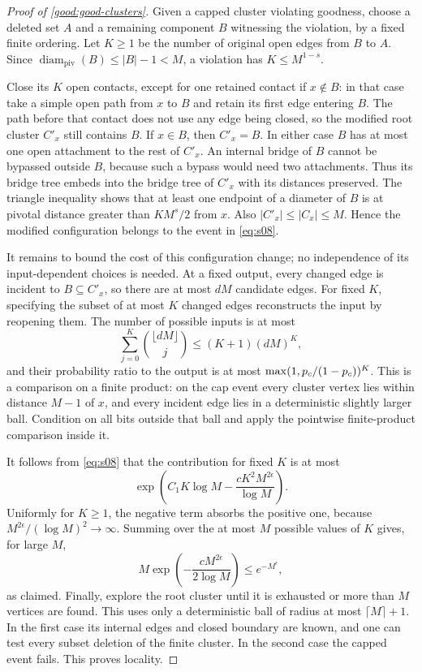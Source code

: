 \begin{proof}[Proof of \cref{good:good-clusters}]
Given a capped cluster violating goodness, choose a deleted set $A$
and a remaining component $B$ witnessing the violation, by a fixed
finite ordering. Let $K\ge1$ be the number of original open edges
from $B$ to $A$. Since
$\operatorname{diam}_{\mathrm{piv}}(B)\le|B|-1<M$, a violation has
$K\le M^{1-s}$.

Close its $K$ open contacts, except for one retained contact if
$x\notin B$: in that case take a simple open path from $x$ to $B$
and retain its first edge entering $B$. The path before that contact
does not use any edge being closed, so the modified root cluster
$C'_x$ still contains $B$. If $x\in B$, then $C'_x=B$. In either
case $B$ has at most one open attachment to the rest of $C'_x$.
An internal bridge of $B$ cannot be bypassed outside $B$, because
such a bypass would need two attachments. Thus its bridge tree
embeds into the bridge tree of $C'_x$ with its distances preserved.
The triangle inequality shows that at least one endpoint of a
diameter of $B$ is at pivotal distance greater than $KM^s/2$ from
$x$. Also $|C'_x|\le|C_x|\le M$. Hence the modified configuration
belongs to the event in \eqref{eq:s08}.

It remains to bound the cost of this configuration change; no
independence of its input-dependent choices is needed. At a fixed
output, every changed edge is incident to $B\subseteq C'_x$, so
there are at most $dM$ candidate edges. For fixed $K$, specifying
the subset of at most $K$ changed edges reconstructs the input by
reopening them. The number of possible inputs is at most
\[
 \sum_{j=0}^K\binom{\lfloor dM\rfloor}{j}\le(K+1)(dM)^K,
\]
and their probability ratio to the output is at most
$\max(1,{p_c}/(1-{p_c}))^K$. This is a comparison on a finite product:
on the cap event every cluster vertex lies within distance $M-1$
of $x$, and every incident edge lies in a deterministic slightly
larger ball. Condition on all bits outside that ball and apply the
pointwise finite-product comparison inside it.

It follows from \eqref{eq:s08} that the contribution for fixed $K$
is at most
\[
 \exp\left(C_1K\log M-
                 \frac{cK^2M^{2\epsilon}}{\log M}\right).
\]
Uniformly for $K\ge1$, the negative term absorbs the positive one,
because $M^{2\epsilon}/(\log M)^2\to\infty$. Summing over the at
most $M$ possible values of $K$ gives, for large $M$,
\[
 M\exp\left(-\frac{cM^{2\epsilon}}{2\log M}\right)
 \le e^{-M^\epsilon},
\]
as claimed. Finally, explore the root cluster until it is exhausted
or more than $M$ vertices are found. This uses only a deterministic
ball of radius at most $\lceil M\rceil+1$. In the first case its
internal edges and closed boundary are known, and one can test
every subset deletion of the finite cluster. In the second case
the capped event fails. This proves locality.
\end{proof}
